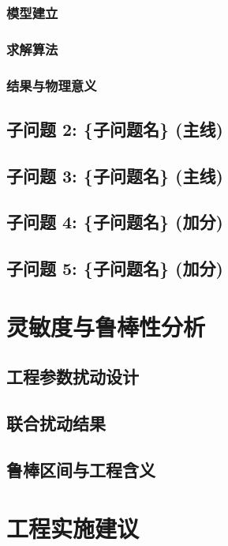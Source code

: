 \documentclass[12pt,a4paper]{ctexart}
\begin{document}
\subsubsection{模型建立}
\subsubsection{求解算法}
\subsubsection{结果与物理意义}

\subsection{子问题 2: \{子问题名\} (主线)}

\subsection{子问题 3: \{子问题名\} (主线)}

\subsection{子问题 4: \{子问题名\} (加分)}

\subsection{子问题 5: \{子问题名\} (加分)}


\section{灵敏度与鲁棒性分析}

\subsection{工程参数扰动设计}

\subsection{联合扰动结果}

\subsection{鲁棒区间与工程含义}

\section{工程实施建议}
\end{document}
